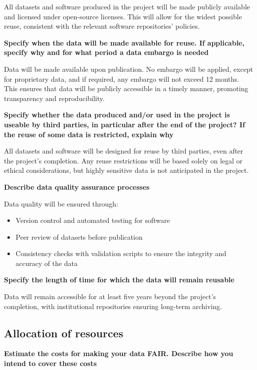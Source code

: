 \documentclass[a4paper,12pt]{article}
\begin{document}
All datasets and software produced in the project will be made publicly available and licensed under open-source licenses. This will allow for the widest possible reuse, consistent with the relevant software repositories' policies. 

\noindent \textbf{Specify when the data will be made available for reuse. If applicable, specify why and for what period a data embargo is needed}

Data will be made available upon publication. No embargo will be applied, except for proprietary data, and if required, any embargo will not exceed 12 months. This ensures that data will be publicly accessible in a timely manner, promoting transparency and reproducibility.

\noindent \textbf{Specify whether the data produced and/or used in the project is useable by third parties, in particular after the end of the project? If the reuse of some data is restricted, explain why}

All datasets and software will be designed for reuse by third parties, even after the project's completion. Any reuse restrictions will be based solely on legal or ethical considerations, but highly sensitive data is not anticipated in the project.

\noindent \textbf{Describe data quality assurance processes}

Data quality will be ensured through:
\begin{itemize}
\item Version control and automated testing for software
\item Peer review of datasets before publication
\item Consistency checks with validation scripts to ensure the integrity and accuracy of the data
\end{itemize}

\noindent\textbf{Specify the length of time for which the data will remain reusable} 

Data will remain accessible for at least five years beyond the project's completion, with institutional repositories ensuring long-term archiving. 

\subsection{Allocation of resources}

\noindent \textbf{Estimate the costs for making your data FAIR. Describe how you intend to cover these costs}
\end{document}

